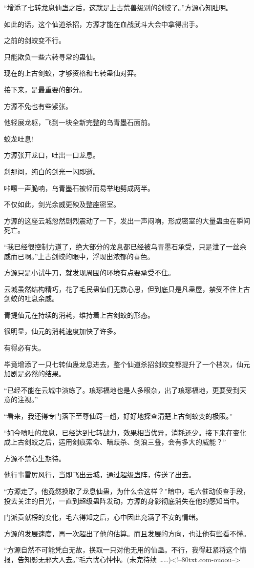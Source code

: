 \begin{this_body}
“增添了七转龙息仙蛊之后，这就是上古荒兽级别的剑蛟了。”方源心知肚明。

如此的话，这个仙道杀招，方源才能在血战武斗大会中拿得出手。

之前的剑蛟变不行。

只能欺负一些六转寻常的蛊仙。

现在的上古剑蛟，才够资格和七转蛊仙对弈。

接下来，是最重要的部分。

方源不免也有些紧张。

他轻展龙躯，飞到一块全新完整的乌青墨石面前。

蛟龙吐息!

方源张开龙口，吐出一口龙息。

刹那间，纯白的剑光一闪即逝。

咔嚓一声脆响，乌青墨石被轻而易举地劈成两半。

不仅如此，剑光余威更殃及整座密室。

方源的这座云城忽然剧烈震动了一下，发出一声闷响，形成密室的大量蛊虫在瞬间死亡。

“我已经很控制力道了，绝大部分的龙息都已经被乌青墨石承受，只是泄了一丝余威而已啊。”上古剑蛟的眼中，浮现出浓郁的喜色。

方源只是小试牛刀，就发现周围的环境有点要承受不住。

云城虽然结构精巧，花了毛民蛊仙们无数心思，但到底只是凡蛊屋，禁受不住上古剑蛟的吐息余威。

青提仙元在持续的消耗，维持着上古剑蛟的形态。

很明显，仙元的消耗速度加快了许多。

有得必有失。

毕竟增添了一只七转仙蛊龙息进去，整个仙道杀招剑蛟变都提升了一个档次，仙元加剧是必然的结果。

“已经不能在云城中演练了。琅琊福地也是人多眼杂，出了琅琊福地，更要受到天意的注视。”

“看来，我还得专门落下至尊仙窍一趟，好好地探查清楚上古剑蛟变的极限。”

“如今喷吐的龙息，已经达到七转战力，效果相当优异，消耗还少。接下来在变化成上古剑蛟之后，运用剑痕索命、暗歧杀、剑浪三叠，会有多大的威能？”

方源不禁心生期待。

他行事雷厉风行，当即飞出云城，通过超级蛊阵，传送了出去。

“方源走了。他竟然换取了龙息仙蛊，为什么会这样？”暗中，毛六催动侦查手段，投去关注的目光，一直到超级蛊阵发动，方源的身影彻底消失在他的感知当中。

门派贡献榜的变化，毛六得知之后，心中因此充满了不安的情绪。

方源的发展速度，再一次超出了他的估算。而且发展的方向，也让他有些看不懂。

“方源自然不可能凭白无故，换取一只对他无用的仙蛊。不行，我得赶紧将这个情报，告知影无邪大人去。”毛六忧心忡忡。(未完待续 ……)<!--80txt.com-ouoou-->

\end{this_body}

